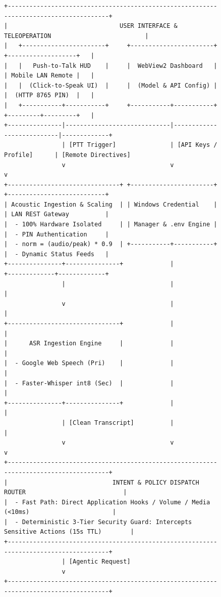 \begin{figure}[htbp]
\centering
{\scriptsize
\begin{verbatim}
+---------------------------------------------------------------------------------------+
|                               USER INTERFACE & TELEOPERATION                          |
|   +-----------------------+     +-----------------------+     +-------------------+   |
|   |   Push-to-Talk HUD    |     |  WebView2 Dashboard   |     | Mobile LAN Remote |   |
|   |  (Click-to-Speak UI)  |     |  (Model & API Config) |     |  (HTTP 8765 PIN)  |   |
|   +-----------+-----------+     +-----------+-----------+     +---------+---------+   |
+---------------|-----------------------------|---------------------------|-------------+
                | [PTT Trigger]               | [API Keys / Profile]      | [Remote Directives]
                v                             v                           v
+-------------------------------+ +-----------------------+ +---------------------------+
| Acoustic Ingestion & Scaling  | | Windows Credential    | | LAN REST Gateway          |
|  - 100% Hardware Isolated     | | Manager & .env Engine | |  - PIN Authentication     |
|  - norm = (audio/peak) * 0.9  | +-----------+-----------+ |  - Dynamic Status Feeds   |
+---------------+---------------+             |             +-------------+-------------+
                |                             |                           |
                v                             |                           |
+-------------------------------+             |                           |
|      ASR Ingestion Engine     |             |                           |
|  - Google Web Speech (Pri)    |             |                           |
|  - Faster-Whisper int8 (Sec)  |             |                           |
+---------------+---------------+             |                           |
                | [Clean Transcript]          |                           |
                v                             v                           v
+---------------------------------------------------------------------------------------+
|                             INTENT & POLICY DISPATCH ROUTER                           |
|  - Fast Path: Direct Application Hooks / Volume / Media (<10ms)                       |
|  - Deterministic 3-Tier Security Guard: Intercepts Sensitive Actions (15s TTL)        |
+---------------------------------------------------------------------------------------+
                | [Agentic Request]
                v
+---------------------------------------------------------------------------------------+

\end{verbatim}}
\end{figure}

